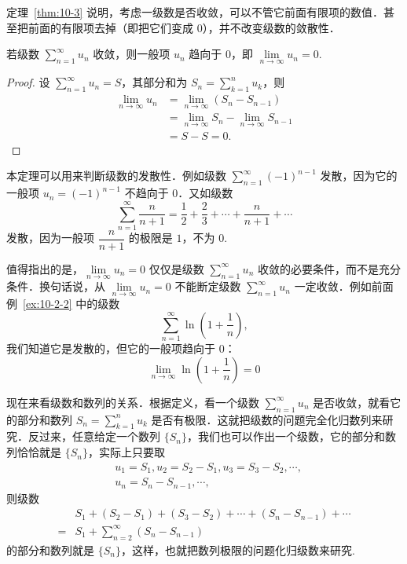 定理~\ref{thm:10-3} 说明，考虑一级数是否收敛，可以不管它前面有限项的数值．甚至把前面的有限项去掉（即把它们变成 $0$），并不改变级数的敛散性．

\begin{theorem}[收敛的必要条件]\label{thm:10-4}
若级数 $\sum_{n=1}^{\infty}u_{n}$ 收敛，则一般项 $u_{n}$ 趋向于 $0$，即 $\lim\limits_{n\to\infty}u_{n}=0$.
\end{theorem}

\begin{proof}
设 $\sum_{n=1}^{\infty}u_{n}=S$，其部分和为 $S_{n}=\sum_{k=1}^{n}u_{k}$，则
\[
\begin{aligned}
\lim_{n\to\infty}u_{n}&=\lim_{n\to\infty}(S_{n}-S_{n-1})\\
&=\lim_{n\to\infty}S_{n}-\lim_{n\to\infty}S_{n-1}\\
&=S-S=0.
\end{aligned}
\]
\end{proof}

本定理可以用来判断级数的发散性．例如级数 $\sum_{n=1}^{\infty}(-1)^{n-1}$ 发散，因为它的一般项 $u_{n}=(-1)^{n-1}$ 不趋向于 $0$．又如级数
\[
\sum_{n=1}^{\infty}\frac{n}{n+1}=\frac{1}{2}+\frac{2}{3}+\cdots+\frac{n}{n+1}+\cdots
\]
发散，因为一般项 $\dfrac{n}{n+1}$ 的极限是 $1$，不为 $0$.

值得指出的是，$\lim\limits_{n\to\infty}u_n=0$ 仅仅是级数 $\sum_{n=1}^{\infty}u_n$ 收敛的必要条件，而不是充分条件．换句话说，从 $\lim\limits_{n\to\infty}u_n=0$ 不能断定级数 $\sum_{n=1}^{\infty}u_n$ 一定收敛．例如前面例~\ref{ex:10-2-2} 中的级数
\[
\sum_{n=1}^{\infty}\ln\left(1+\frac{1}{n}\right),
\]
我们知道它是发散的，但它的一般项趋向于 $0$：
\[
\lim_{n\to\infty}\ln\left(1+\frac{1}{n}\right)=0
\]

现在来看级数和数列的关系．根据定义，看一个级数 $\sum_{n=1}^{\infty}u_{n}$ 是否收敛，就看它的部分和数列 $S_{n}=\sum_{k=1}^{n}u_{k}$ 是否有极限．这就把级数的问题完全化归数列来研究．反过来，任意给定一个数列 $\{S_{n}\}$，我们也可以作出一个级数，它的部分和数列恰恰就是 $\{S_{n}\}$，实际上只要取
\[
\begin{aligned}
&u_{1}=S_{1},u_{2}=S_{2}-S_{1},u_{3}=S_{3}-S_{2},\cdots,\\
&u_{n}=S_{n}-S_{n-1},\cdots,
\end{aligned}
\]
则级数
\[
\begin{aligned}
&S_{1}+(S_{2}-S_{1})+(S_{3}-S_{2})+\cdots+(S_{n}-S_{n-1})+\cdots\\
={}&S_{1}+\sum_{n=2}^{\infty}(S_{n}-S_{n-1})
\end{aligned}
\]
的部分和数列就是 $\{S_{n}\}$，这样，也就把数列极限的问题化归级数来研究.

